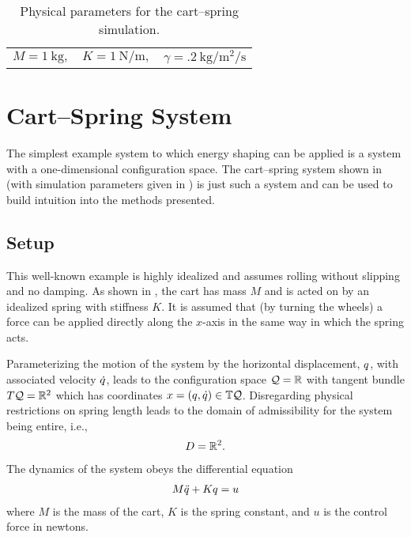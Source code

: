 \begin{table}[t!]
  \caption{Physical parameters for the cart--spring simulation.}
  \label{tab:cart_spring_parameters}
  \centering
  \begin{tabular}{c c c}
    $M = 1 \ \mathrm{kg},$ &
    $K = 1 \ \mathrm{N/m},$ &
    $\gamma = .2 \ \mathrm{kg/m^{2}/s}$
  \end{tabular}
  \vspace{-1em}
\end{table}

\section{Cart--Spring System}\label{sec:cart_spring}

The simplest example system to which energy shaping can be applied is a system
with a one-dimensional configuration space.
% 
The cart--spring system shown in  (with
simulation parameters given in ) is just such
a system and can be used to build intuition into the methods presented.

\subsection{Setup}

This well-known example is highly idealized and assumes rolling without slipping
and no damping.
% 
As shown in , the cart has mass $M$ and is
acted on by an idealized spring with stiffness $K$.
% 
It is assumed that (by turning the wheels) a force can be applied directly along
the $x$-axis in the same way in which the spring acts.

% 
Parameterizing the motion of the system by the horizontal displacement, $q$, with
associated velocity $\dot{q}$, leads to the configuration space $\mathcal{Q} = \mathbb{R}$ with
tangent bundle $T\mathcal{Q} = \mathbb{R}^{2}$ which has coordinates $x = (q, \dot{q}) \in \mathbb{T}\mathcal{Q}$.
% 
Disregarding physical restrictions on spring length leads to the domain of
admissibility for the system being entire, i.e.,
\begin{align*}
  D = \mathbb{R}^{2}.
\end{align*}
% 
The dynamics of the system obeys the differential equation
\begin{align*}
  M \ddot{q} + K q = u
\end{align*}
where $M$ is the mass of the cart, $K$ is the spring constant, and $u$ is the
control force in newtons.

